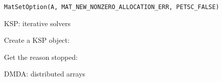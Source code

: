 \begin{verbatim}
MatSetOption(A, MAT_NEW_NONZERO_ALLOCATION_ERR, PETSC_FALSE)
\end{verbatim}

 {KSP: iterative solvers}

Create a KSP object:
%

Get the reason  stopped:
%

 {DMDA: distributed arrays}

